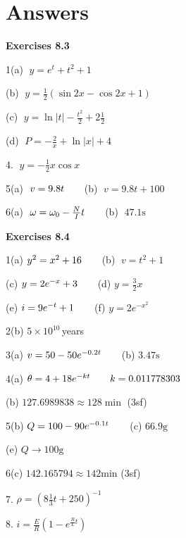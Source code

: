 \section{Answers}
\textbf{Exercises 8.3} 
\columnsep=30pt
\begin{multicols}{2}

1(a) $\;y =e^{t} +t^{2} +1$ 

(b) $\;y =\frac{1}{2} \left (\sin  2 x -\cos  2 x +1\right )$ 

(c) $\;y =\ln  \left \vert t\right \vert  -\frac{t^{2}}{2} +2\frac{1}{2}$ 

(d) $\;P = -\frac{2}{x} +\ln  \left \vert x\right \vert  +4$ 

4. $\;y = -\frac{1}{2} x \cos  x$ 

5(a) $\;v =9.8 t\text{\quad \quad }$(b) $\;v =9.8 t +100$ 

6(a) $\;\omega  =\omega _{0} -\frac{N}{I} t\text{\quad \quad }$(b) $\;47.1 \mbox{s}$ 

\textbf{Exercises 8.4} 

1(a)  $y^{2} =x^{2} +16\text{\quad \quad }$(b) $\;v =t^{2} +1$ 

(c)  $y =2 e^{ -x} +3\text{\quad \quad }$(d)  $y =\frac{3}{2} x$ 

(e)  $i =9 e^{ -t} +1\text{\quad \quad }$(f)  $y =2 e^{ -x^{2}}$ 

2(b)  $5 \times 10^{10}\,$years 

3(a)  $v =50 -50 e^{ -0.2 t}\text{\quad \quad }$(b)  $3.47 \mbox{s}$ 

4(a)  $\theta  =4 +18 e^{ -k t}\text{\quad \quad }k =0.011778303$ 

(b)  $127.6989838 \approx 128\min $ (3sf) 

5(b)  $Q =100 -90 e^{ -0.1 t}\text{\quad \quad }$(c)  $66.9 \mbox{g}$ 

(e)  $Q \rightarrow 100 \mbox{g}$ 

6(c)  $142.165794 \approx 142 \mbox{min}$ (3sf) 

7.  $\rho  =\left (8\frac{1}{3} t +250\right )^{ -1}$ 

8.  $i =\frac{E}{R} \left (1 -e^{\frac{R}{L} t}\right )$ 
\end{multicols}
